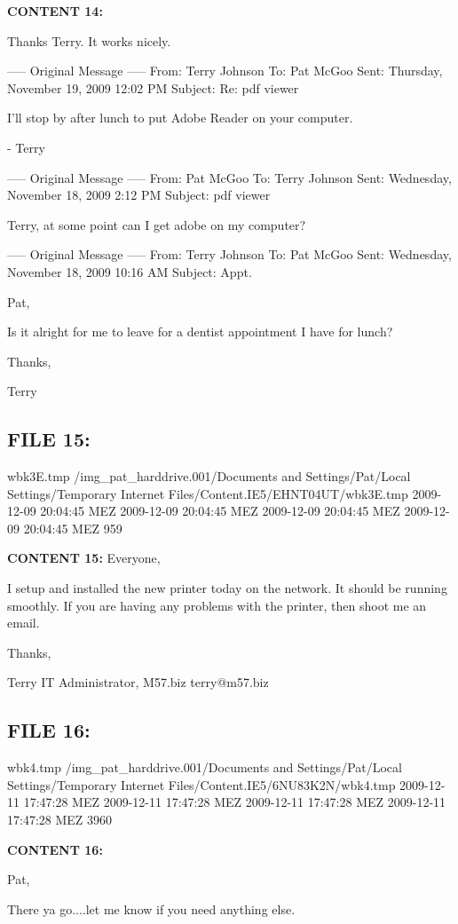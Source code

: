 \textbf{CONTENT 14:}

Thanks Terry.  It works nicely.

----- Original Message -----
From: Terry Johnson
To: Pat McGoo
Sent: Thursday, November 19, 2009 12:02 PM
Subject: Re: pdf viewer

I'll stop by after lunch to put Adobe Reader on your computer.

- Terry

----- Original Message -----
From: Pat McGoo
To: Terry Johnson
Sent: Wednesday, November 18, 2009 2:12 PM
Subject: pdf viewer

Terry, at some point can I get adobe on my computer?

----- Original Message -----
From: Terry Johnson
To: Pat McGoo
Sent: Wednesday, November 18, 2009 10:16 AM
Subject: Appt.

Pat,

Is it alright for me to leave for a dentist appointment I have for
lunch?

Thanks,

Terry


\subsection{FILE 15:}
wbk3E.tmp	/img_pat_harddrive.001/Documents and Settings/Pat/Local Settings/Temporary Internet Files/Content.IE5/EHNT04UT/wbk3E.tmp		2009-12-09 20:04:45 MEZ	2009-12-09 20:04:45 MEZ	2009-12-09 20:04:45 MEZ	2009-12-09 20:04:45 MEZ	959	

\textbf{CONTENT 15:}
Everyone,

I setup and installed the new printer today on the network.  It should be 
running smoothly.  If you are having any problems with the printer, then 
shoot me an email.

Thanks,

Terry
IT Administrator, M57.biz
terry@m57.biz


\subsection{FILE 16:}
wbk4.tmp	/img_pat_harddrive.001/Documents and Settings/Pat/Local Settings/Temporary Internet Files/Content.IE5/6NU83K2N/wbk4.tmp		2009-12-11 17:47:28 MEZ	2009-12-11 17:47:28 MEZ	2009-12-11 17:47:28 MEZ	2009-12-11 17:47:28 MEZ	3960	

\textbf{CONTENT 16:}

Pat,

There ya go....let me know if you need anything else. 

